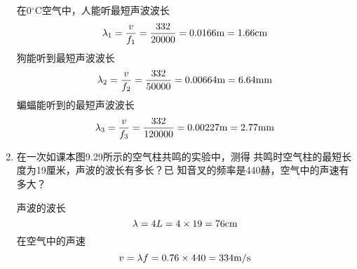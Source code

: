 \begin{enumerate}
\begin{solution}
    在0$^{\circ}$C空气中，人能听最短声波波长
    \[\lambda_1=\frac{v}{f_1}=\frac{332}{20000}=0.0166{\rm m}=1.66{\rm cm}\]
    狗能听到最短声波波长
    \[\lambda_2=\frac{v}{f_2}=\frac{332}{50000}=0.00664{\rm m}=6.64{\rm mm}\]
    蝙蝠能听到的最短声波波长
    \[\lambda_3=\frac{v}{f_3}=\frac{332}{120000}=0.00227{\rm m}=2.77{\rm mm}\]
\end{solution}
\item 在一次如课本图9.29所示的空气柱共鸣的实验中，测得
共鸣时空气柱的最短长度为19厘米，声波的波长有多长？已
知音叉的频率是440赫，空气中的声速有多大？


\begin{solution}
    声波的波长
    \[\lambda=4L=4\times19=76{\rm cm}\]
在空气中的声速
\[v=\lambda f=0.76\times440=334\text{m}/\text{s}\]
\end{solution}

\end{enumerate}




